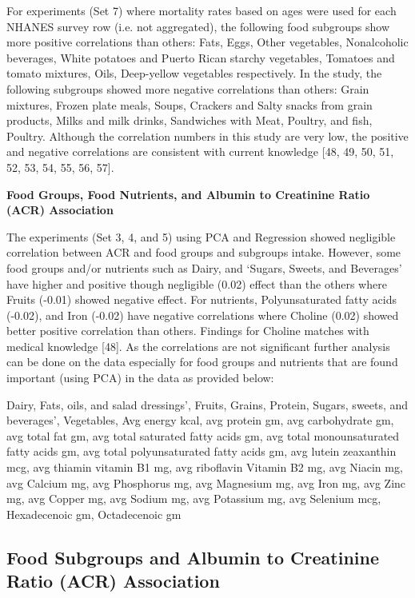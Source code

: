 \noindent For experiments (Set 7) where mortality rates based on ages were used for each NHANES survey row (i.e. not aggregated), the following food subgroups show more positive correlations than others: Fats, Eggs, Other vegetables, Nonalcoholic beverages, White potatoes and Puerto Rican starchy vegetables, Tomatoes and tomato mixtures, Oils, Deep-yellow vegetables respectively. In the study, the following subgroups showed more negative correlations than others: Grain mixtures, Frozen plate meals, Soups, Crackers and Salty snacks from grain products, Milks and milk drinks, Sandwiches with Meat, Poultry, and fish, Poultry. Although the correlation numbers in this study are very low, the positive and negative correlations are consistent with current knowledge [48, 49, 50, 51, 52, 53, 54, 55, 56, 57].


\noindent \textbf{Food Groups, Food Nutrients, and Albumin to Creatinine Ratio (ACR) Association}

\noindent The experiments (Set 3, 4, and 5) using PCA and Regression showed negligible correlation between ACR and food groups and subgroups intake. However, some food groups and/or nutrients such as Dairy, and  `Sugars, Sweets, and Beverages'  have higher and positive though negligible (0.02) effect than the others where Fruits (-0.01) showed negative effect.  For nutrients, Polyunsaturated fatty acids (-0.02), and Iron (-0.02) have negative correlations where Choline (0.02) showed better positive correlation than others. Findings for Choline matches with medical knowledge [48]. As the correlations are not significant further analysis can be done on the data especially for food groups and nutrients that are found important (using PCA) in the data as provided below:

\noindent Dairy,  Fats, oils, and salad dressings’,  Fruits,  Grains,  Protein,   Sugars, sweets, and beverages’, Vegetables, Avg energy kcal,  avg protein gm,  avg carbohydrate gm,  avg total fat gm,  avg total saturated fatty acids gm, avg total monounsaturated fatty acids gm,  avg total polyunsaturated fatty acids gm, avg lutein zeaxanthin mcg,  avg thiamin vitamin B1 mg,  avg riboflavin Vitamin B2 mg,  avg Niacin mg, avg Calcium mg,  avg Phosphorus mg,  avg Magnesium mg,  avg Iron mg, avg Zinc mg,  avg Copper mg,  avg Sodium mg,  avg Potassium mg,  avg Selenium mcg,  Hexadecenoic gm,  Octadecenoic gm

\subsection{Food Subgroups and Albumin to Creatinine Ratio (ACR) Association}

